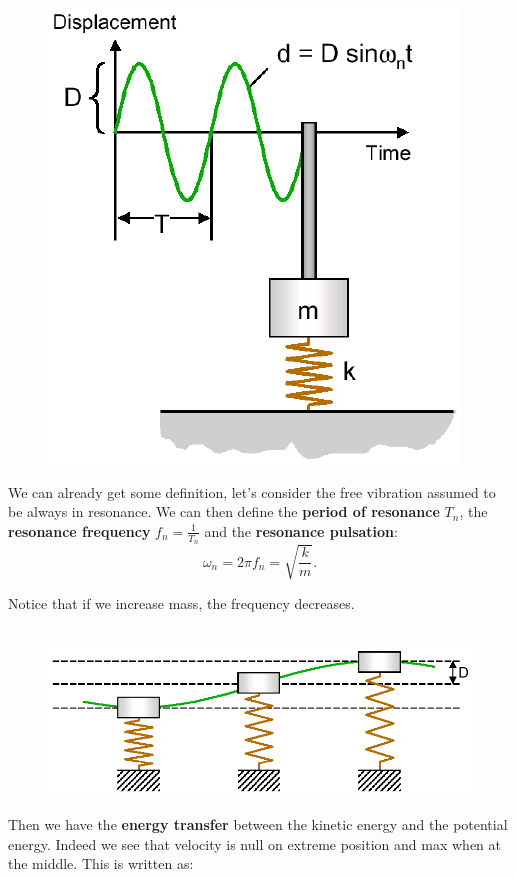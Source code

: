 			\begin{figure}
			\vspace{-8mm}
			\includegraphics[scale=0.35]{ch1/2}
			\end{figure}		
			We can already get some definition, let's consider the free vibration assumed to be always in resonance. We can then define the \textbf{period of resonance} $T_n$, the \textbf{resonance frequency} $f_n = \frac{1}{T_n}$ and the \textbf{resonance pulsation}:
			\begin{equation}
			\omega _n = 2\pi f_n = \sqrt{\frac{k}{m}}.
			\end{equation}
			
			Notice that if we increase mass, the frequency decreases. 
			\\\\
			
			\begin{figure}
			\vspace{-5mm}
			\includegraphics[scale=0.3]{ch1/3}
			\end{figure}
			Then we have the \textbf{energy transfer} between the kinetic energy and the potential energy. Indeed we see that velocity is null on extreme position and max when at the middle. This is written as:
			
